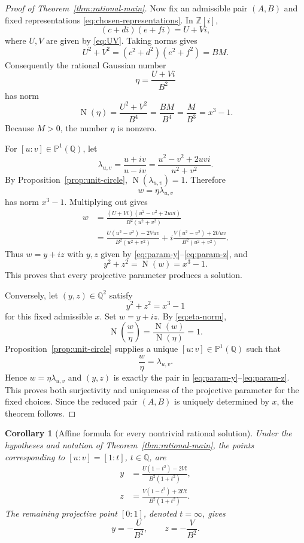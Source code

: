 \documentclass[11pt,a4paper]{article}
\numberwithin{equation}{section}
\newtheorem{corollary}[theorem]{Corollary}
\theoremstyle{definition}
\theoremstyle{remark}
\newcommand{\Z}{\mathbb Z}
\newcommand{\Q}{\mathbb Q}
\newcommand{\PP}{\mathbb P}
\newcommand{\Zi}{\Z[i]}
\newcommand{\Norm}{\operatorname{N}}
\begin{document}
\begin{proof}[Proof of Theorem~\ref{thm:rational-main}]
Now fix an admissible pair $(A,B)$ and fixed representations \eqref{eq:chosen-representations}. In $\Zi$,
\[
 (c+di)(e+fi)=U+Vi,
\]
where $U,V$ are given by \eqref{eq:UV}. Taking norms gives
\begin{equation}
 U^2+V^2
 =(c^2+d^2)(e^2+f^2)
 =BM.
 \label{eq:UV-norm}
\end{equation}
Consequently the rational Gaussian number
\begin{equation}
 \eta=\frac{U+Vi}{B^2}
 \label{eq:eta}
\end{equation}
has norm
\begin{equation}
 \Norm(\eta)
 =\frac{U^2+V^2}{B^4}
 =\frac{BM}{B^4}
 =\frac{M}{B^3}
 =x^3-1.
 \label{eq:eta-norm}
\end{equation}
Because $M>0$, the number $\eta$ is nonzero.

For $[u:v]\in\PP^1(\Q)$, let
\[
 \lambda_{u,v}
 =\frac{u+iv}{u-iv}
 =\frac{u^2-v^2+2uvi}{u^2+v^2}.
\]
By Proposition~\ref{prop:unit-circle}, $\Norm(\lambda_{u,v})=1$. Therefore
\[
 w=\eta\lambda_{u,v}
\]
has norm $x^3-1$. Multiplying out gives
\begin{align*}
 w
 &=\frac{(U+Vi)(u^2-v^2+2uvi)}{B^2(u^2+v^2)}\\
 &=\frac{U(u^2-v^2)-2Vuv}{B^2(u^2+v^2)}
  +i\frac{V(u^2-v^2)+2Uuv}{B^2(u^2+v^2)}.
\end{align*}
Thus $w=y+iz$ with $y,z$ given by \eqref{eq:param-y}--\eqref{eq:param-z}, and
\[
 y^2+z^2=\Norm(w)=x^3-1.
\]
This proves that every projective parameter produces a solution.

Conversely, let $(y,z)\in\Q^2$ satisfy
\[
 y^2+z^2=x^3-1
\]
for this fixed admissible $x$. Set $w=y+iz$. By \eqref{eq:eta-norm},
\[
 \Norm\left(\frac w\eta\right)
 =\frac{\Norm(w)}{\Norm(\eta)}
 =1.
\]
Proposition~\ref{prop:unit-circle} supplies a unique $[u:v]\in\PP^1(\Q)$ such that
\[
 \frac w\eta=\lambda_{u,v}.
\]
Hence $w=\eta\lambda_{u,v}$ and $(y,z)$ is exactly the pair in \eqref{eq:param-y}--\eqref{eq:param-z}. This proves both surjectivity and uniqueness of the projective parameter for the fixed choices. Since the reduced pair $(A,B)$ is uniquely determined by $x$, the theorem follows.
\end{proof}

\begin{corollary}[Affine formula for every nontrivial rational solution]
\label{cor:affine-rational-param}
Under the hypotheses and notation of Theorem~\ref{thm:rational-main}, the points corresponding to $[u:v]=[1:t]$, $t\in\Q$, are
\begin{align}
 y&=\frac{U(1-t^2)-2Vt}{B^2(1+t^2)},
 \label{eq:affine-y}\\
 z&=\frac{V(1-t^2)+2Ut}{B^2(1+t^2)}.
 \label{eq:affine-z}
\end{align}
The remaining projective point $[0:1]$, denoted $t=\infty$, gives
\begin{equation}
 y=-\frac U{B^2},
 \qquad
 z=-\frac V{B^2}.
 \label{eq:t-infinity}
\end{equation}
\end{corollary}
\end{document}
